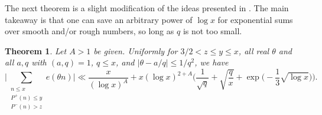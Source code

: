 \documentclass[12pt]{amsart}
\renewcommand{\leq}{\leqslant}
\numberwithin{equation}{section}
\theoremstyle{plain}
\newtheorem{thm}{Theorem}[section]
\theoremstyle{definition}
\begin{document}
	The next theorem is a slight modification of the ideas presented in \cite{granville breteche exp sums}. The main takeaway is that one can save an arbitrary power of $\log x$ for exponential sums over smooth and/or rough numbers, so long as $q$ is not too small.
	\begin{thm} \label{thm: exp sum smooth}
		Let $A > 1$ be given. Uniformly for $3/2 < z \leq y \leq x$, all real $\theta$ and all $a,q$ with $(a,q)=1$, $q \leq x$, and $|\theta -a/q| \leq 1/q^2$, we have
		$$\bigg|\sum_{\substack{n \leq x \\ P^+(n) \leq y \\ P^-(n) > z}} e(\theta n)\bigg| \ll \frac{x}{(\log x)^{A}} +x (\log x)^{2+A} \bigg(\frac{1}{\sqrt{q}}+\sqrt{\frac{q}{x}} + \exp\bigg(-\frac{1}{3}\sqrt{\log x}\bigg) \bigg). $$
	\end{thm}
\end{document}
